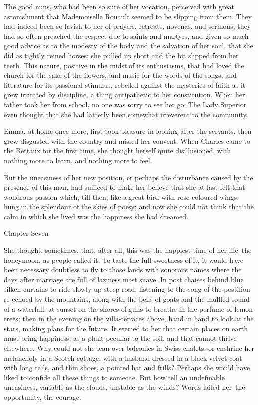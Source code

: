 \documentclass{tufte-book}
\begin{document}
The good nuns, who had been so sure of her vocation, perceived with
great astonishment that Mademoiselle Rouault seemed to be slipping
from them. They had indeed been so lavish to her of prayers, retreats,
novenas, and sermons, they had so often preached the respect due to
saints and martyrs, and given so much good advice as to the modesty of
the body and the salvation of her soul, that she did as tightly reined
horses; she pulled up short and the bit slipped from her teeth. This
nature, positive in the midst of its enthusiasms, that had loved the
church for the sake of the flowers, and music for the words of the
songs, and literature for its passional stimulus, rebelled against
the mysteries of faith as it grew irritated by discipline, a thing
antipathetic to her constitution. When her father took her from school,
no one was sorry to see her go. The Lady Superior even thought that she
had latterly been somewhat irreverent to the community.

Emma, at home once more, first took pleasure in looking after the
servants, then grew disgusted with the country and missed her convent.
When Charles came to the Bertaux for the first time, she thought herself
quite disillusioned, with nothing more to learn, and nothing more to
feel.

But the uneasiness of her new position, or perhaps the disturbance
caused by the presence of this man, had sufficed to make her believe
that she at last felt that wondrous passion which, till then, like a
great bird with rose-coloured wings, hung in the splendour of the skies
of poesy; and now she could not think that the calm in which she lived
was the happiness she had dreamed.



Chapter Seven

She thought, sometimes, that, after all, this was the happiest time
of her life--the honeymoon, as people called it. To taste the full
sweetness of it, it would have been necessary doubtless to fly to those
lands with sonorous names where the days after marriage are full of
laziness most suave. In post chaises behind blue silken curtains to ride
slowly up steep road, listening to the song of the postilion re-echoed
by the mountains, along with the bells of goats and the muffled sound of
a waterfall; at sunset on the shores of gulfs to breathe in the perfume
of lemon trees; then in the evening on the villa-terraces above, hand in
hand to look at the stars, making plans for the future. It seemed to her
that certain places on earth must bring happiness, as a plant peculiar
to the soil, and that cannot thrive elsewhere. Why could not she lean
over balconies in Swiss chalets, or enshrine her melancholy in a Scotch
cottage, with a husband dressed in a black velvet coat with long tails,
and thin shoes, a pointed hat and frills? Perhaps she would have liked
to confide all these things to someone. But how tell an undefinable
uneasiness, variable as the clouds, unstable as the winds? Words failed
her--the opportunity, the courage.
\end{document}
